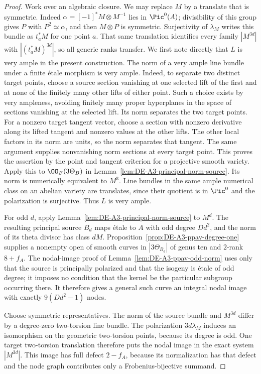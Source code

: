 \begin{proof}
Work over an algebraic closure.  We may replace $M$ by a translate
that is symmetric.  Indeed
$\alpha=[-1]^*M\otimes M^{-1}$ lies in $\Pic^0(A)$; divisibility
of this group gives $P$ with $P^2\simeq\alpha$, and then $M\otimes P$
is symmetric.  Surjectivity of $\lambda_M$ writes this bundle as
$t_a^*M$ for one point $a$.  That same translation identifies every
family $|M^{3d}|$ with $|(t_a^*M)^{3d}|$, so all generic ranks transfer.
We first note directly that $L$ is
very ample in the present construction.  The norm of a very ample line
bundle under a finite \'etale morphism is very ample.  Indeed, to
separate two distinct target points, choose a source section vanishing
at one selected lift of the first and at none of the finitely many
other lifts of either point.  Such a choice exists by very ampleness,
avoiding finitely many proper hyperplanes in the space of sections
vanishing at the selected lift.  Its norm separates the two target
points.  For a nonzero target tangent vector, choose a section with
nonzero derivative along its lifted tangent and nonzero values at the
other lifts.  The other local factors in its norm are units, so the
norm separates that tangent.  The same argument supplies nonvanishing
norm sections at every target point.  This proves the assertion by the
point and tangent criterion for a projective smooth variety.
Apply this to $\OO_B(3\Theta_B)$ in
Lemma~\ref{lem:DE-A3-principal-norm-source}.  Its norm is numerically
equivalent to $M^3$.  Line bundles in the same ample numerical class
on an abelian variety are translates, since their quotient is in
$\Pic^0$ and the polarization is surjective.  Thus $L$ is very ample.

For odd $d$, apply Lemma~\ref{lem:DE-A3-principal-norm-source} to
$M^d$.  The resulting principal source $B_d$ maps \'etale to $A$
with odd degree $Dd^2$, and the norm of its theta divisor has class
$dM$.  Proposition~\ref{prop:DE-A3-ppav-degree-one} supplies a
nonempty open of smooth curves in $|3\Theta_{B_d}|$ of genus ten and
$2$-rank $8+f_A$.
The nodal-image proof of Lemma~\ref{lem:DE-A3-ppav-odd-norm}
uses only that the source is principally polarized and that the
isogeny is \'etale of odd degree; it imposes no condition that the
kernel be the particular subgroup occurring there.
It therefore gives a general such curve an integral nodal image with
exactly $9(Dd^2-1)$ nodes.

Choose symmetric representatives.  The norm of the source bundle and
$M^{3d}$ differ by a degree-zero two-torsion line bundle.
The polarization $3d\lambda_M$ induces an isomorphism on the geometric
two-torsion points, because its degree is odd.  One target
two-torsion translation therefore puts the nodal image in the exact
system $|M^{3d}|$.  This image has full defect $2-f_A$, because its
normalization has that defect and the node graph contributes only a
Frobenius-bijective summand.


\end{proof}
